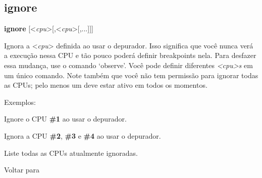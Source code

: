 \documentclass[letterpaper,10pt,brazil]{sphinxmanual}
\begin{document}
\subsection{ignore}
\label{debugger/execution:ignore}\label{debugger/execution:debugger-command-ignore}
\begin{DUlineblock}{0em}
\item[]
\begin{DUlineblock}{\DUlineblockindent}
\item[] \textbf{ignore} {[}\textless{}\emph{cpu}\textgreater{}{[},\textless{}\emph{cpu}\textgreater{}{[},...{]}{]}{]}
\item[] 
\end{DUlineblock}
\item[] Ignora a \textless{}\emph{cpu}\textgreater{} definida ao usar o depurador. Isso significa que você nunca verá a execução nessa CPU e tão pouco poderá definir breakpoints nela. Para desfazer essa mudança, use o comando `observe'. Você pode definir diferentes \emph{\textless{}cpu\textgreater{}s} em um único comando. Note também que você não tem permissão para ignorar todas as CPUs; pelo menos um deve estar ativo em todos os momentos.
\item[] 
\item[] Exemplos:
\item[] 
\item[]
\begin{DUlineblock}{\DUlineblockindent}
\item[] 
\item[] 
\end{DUlineblock}
\item[] Ignore o CPU \textbf{\#1} ao usar o depurador.
\item[] 
\item[]
\begin{DUlineblock}{\DUlineblockindent}
\item[] 
\item[] 
\end{DUlineblock}
\item[] Ignora a CPU \textbf{\#2}, \textbf{\#3} e \textbf{\#4} ao usar o depurador.
\item[] 
\item[]
\begin{DUlineblock}{\DUlineblockindent}
\item[] 
\item[] 
\end{DUlineblock}
\item[] Liste todas as CPUs atualmente ignoradas.
\item[] 
\item[] Voltar para {\hyperref[debugger/execution:debugger\string-execution\string-list]{}}
\end{DUlineblock}
\begin{quote}
\label{debugger/execution:debugger-command-observe}\end{quote}
\end{document}
